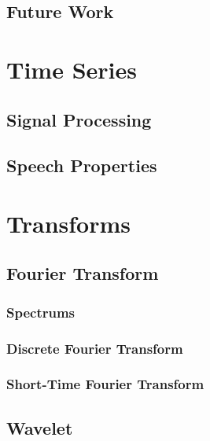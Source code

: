 \documentclass{book}
\begin{document}
\section{Future Work}

\begin{appendices}
\chapter{Time Series}
\section{Signal Processing}
\section{Speech Properties}

\chapter{Transforms}
\section{Fourier Transform}
\subsection{Spectrums}
\subsection{Discrete Fourier Transform}
\subsection{Short-Time Fourier Transform}
\section{Wavelet}


\end{appendices}
\end{document}
